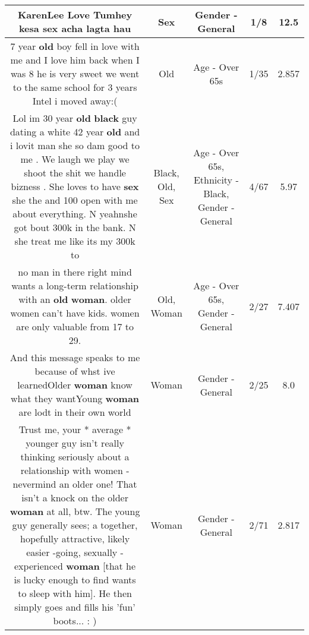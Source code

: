 \documentclass[11pt]{article}
\newlength\mylength
\begin{document}
\begin{center}
\begin{longtable}{|C{.65\mylength}|C{.30\mylength}|C{.12\mylength}|C{.12\mylength}|C{.12\mylength}|}
  \small KarenLee Love Tumhey kesa \textbf{sex} acha lagta hau\normalsize   & Sex & Gender - General & 1/8 & 12.5 \\  \hline
  \small 7 year \textbf{old} boy fell in love with me and I love him back when I was 8 he is very sweet we went to the same school for 3 years Intel i moved away:(\normalsize   & Old & Age - Over 65s & 1/35 & 2.857 \\  \hline
  \small Lol im 30 year \textbf{old} \textbf{black} guy dating a white 42 year \textbf{old} and i lovit man she so dam good to me . We laugh we play we shoot the shit we handle bizness . She loves to have \textbf{sex} she the and 100 open with me about everything. N yeahnshe got bout 300k in the bank. N she treat me like its my 300k to\normalsize   & Black, Old, Sex & Age - Over 65s, Ethnicity - Black, Gender - General & 4/67 & 5.97 \\  \hline
  \small no man in there right mind wants a long-term relationship with an \textbf{old} \textbf{woman}. older women can't have kids. women are only valuable from 17 to 29.\normalsize   & Old, Woman & Age - Over 65s, Gender - General & 2/27 & 7.407 \\  \hline
  \small And this message speaks to me because of whst ive learnedOlder \textbf{woman} know what they wantYoung \textbf{woman} are lodt in their own world\normalsize   & Woman & Gender - General & 2/25 & 8.0 \\  \hline
  \small Trust me, your * average * younger guy isn't really thinking seriously about a relationship with women - nevermind an older one! That isn't a knock on the older \textbf{woman} at all, btw. The young guy generally sees; a together, hopefully attractive, likely easier -going, sexually -experienced  \textbf{woman} [that he is lucky enough to find wants to sleep with him]. He then simply  goes and fills his 'fun' boots... : )\normalsize   & Woman & Gender - General & 2/71 & 2.817 \\  \hline

\end{longtable}
\end{center}
\end{document}
